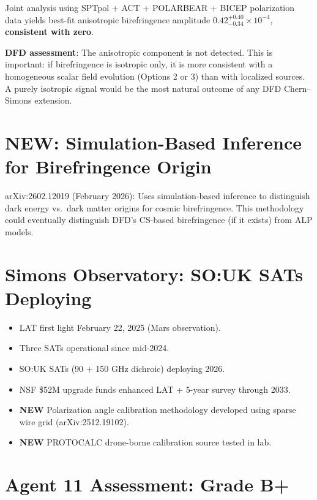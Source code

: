 \documentclass[11pt,a4paper]{article}
\newcommand{\NEW}{\textcolor{dfdblue}{\textbf{NEW}}}
\begin{document}
\begin{tcolorbox}[colback=blue!5!white, colframe=blue!60!black,
  title={arXiv:2504.13154 (June 2025): Anisotropic Birefringence from CMB B-mode}]

Joint analysis using SPTpol + ACT + POLARBEAR + BICEP polarization data yields best-fit anisotropic birefringence amplitude $0.42^{+0.40}_{-0.34} \times 10^{-4}$, \textbf{consistent with zero}.

\textbf{DFD assessment}: The anisotropic component is not detected. This is important: if birefringence is isotropic only, it is more consistent with a homogeneous scalar field evolution (Options 2 or 3) than with localized sources. A purely isotropic signal would be the most natural outcome of any DFD Chern--Simons extension.
\end{tcolorbox}

\section{\NEW: Simulation-Based Inference for Birefringence Origin}

arXiv:2602.12019 (February 2026): Uses simulation-based inference to distinguish dark energy vs.\ dark matter origins for cosmic birefringence. This methodology could eventually distinguish DFD's CS-based birefringence (if it exists) from ALP models.

\section{Simons Observatory: SO:UK SATs Deploying}

\begin{itemize}
\item LAT first light February 22, 2025 (Mars observation).
\item Three SATs operational since mid-2024.
\item SO:UK SATs (90 + 150 GHz dichroic) deploying 2026.
\item NSF \$52M upgrade funds enhanced LAT + 5-year survey through 2033.
\item \NEW{} Polarization angle calibration methodology developed using sparse wire grid (arXiv:2512.19102).
\item \NEW{} PROTOCALC drone-borne calibration source tested in lab.
\end{itemize}

\section{Agent 11 Assessment: Grade B+}
\end{document}
